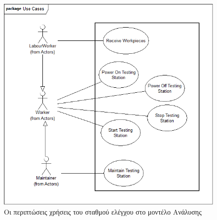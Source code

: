 \documentclass[a4paper,12pt,twoside]{report}
\begin{document}
{\begin{appendices}
			\begin{figure}[hp]
					\centering
					\includegraphics[scale=0.30]{AnalysisModel_uc-TestingStationsUseCases.png}
					\caption{Οι περιπτώσεις χρήσεις του σταθμού ελέγχου στο μοντέλο Ανάλυσης}
					\label{φωτ:Οι περιπτώσεις χρήσεις του σταθμού ελέγχου στο μοντέλο Ανάλυσης}
			\end{figure}
			

\end{appendices}}
\end{document}
